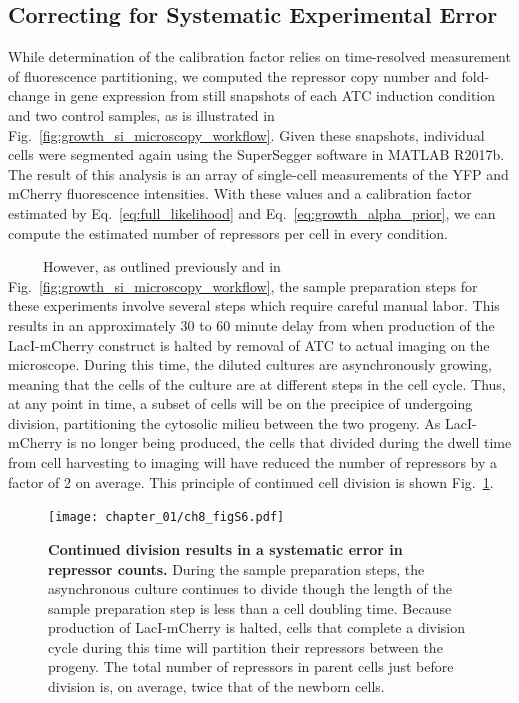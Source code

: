 \documentclass[12pt]{caltech_thesis}
\begin{document}
\hypertarget{correcting-for-systematic-experimental-error}{%
\subsection{Correcting for Systematic Experimental
Error}\label{correcting-for-systematic-experimental-error}}

While determination of the calibration factor relies on time-resolved
measurement of fluorescence partitioning, we computed the repressor copy
number and fold-change in gene expression from still snapshots of each
ATC induction condition and two control samples, as is illustrated in
Fig.~\ref{fig:growth_si_microscopy_workflow}. Given these snapshots,
individual cells were segmented again using the SuperSegger software in
MATLAB R2017b. The result of this analysis is an array of single-cell
measurements of the YFP and mCherry fluorescence intensities. With these
values and a calibration factor estimated by
Eq.~\ref{eq:full_likelihood} and Eq.~\ref{eq:growth_alpha_prior}, we can
compute the estimated number of repressors per cell in every condition.

~~~~~However, as outlined previously and in
Fig.~\ref{fig:growth_si_microscopy_workflow}, the sample preparation
steps for these experiments involve several steps which require careful
manual labor. This results in an approximately 30 to 60 minute delay
from when production of the LacI-mCherry construct is halted by removal
of ATC to actual imaging on the microscope. During this time, the
diluted cultures are asynchronously growing, meaning that the cells of
the culture are at different steps in the cell cycle. Thus, at any point
in time, a subset of cells will be on the precipice of undergoing
division, partitioning the cytosolic milieu between the two progeny. As
LacI-mCherry is no longer being produced, the cells that divided during
the dwell time from cell harvesting to imaging will have reduced the
number of repressors by a factor of 2 on average. This principle of
continued cell division is shown Fig.~\ref{fig:correction_origin}.

\hypertarget{fig:correction_origin}{%
\begin{figure}
\centering
\texttt{[image: chapter\_01/ch8\_figS6.pdf]}
\caption[{Origin of a systematic error in repressor counting due to
continued growth.}]{\textbf{Continued division results in a systematic
error in repressor counts.} During the sample preparation steps, the
asynchronous culture continues to divide though the length of the sample
preparation step is less than a cell doubling time. Because production
of LacI-mCherry is halted, cells that complete a division cycle during
this time will partition their repressors between the progeny. The total
number of repressors in parent cells just before division is, on
average, twice that of the newborn cells.}
\label{fig:correction_origin}
\end{figure}
}
\end{document}
